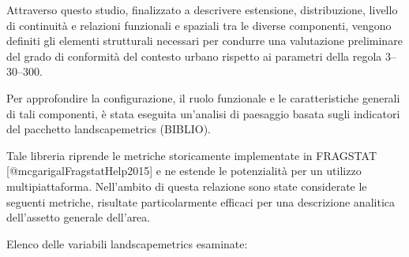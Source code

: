 \documentclass[
  a4paper,
]{book}
\begin{document}
Attraverso questo studio, finalizzato a descrivere estensione, distribuzione, livello di continuità e relazioni funzionali e spaziali tra le diverse componenti, vengono definiti gli elementi strutturali necessari per condurre una valutazione preliminare del grado di conformità del contesto urbano rispetto ai parametri della regola 3--30--300.

Per approfondire la configurazione, il ruolo funzionale e le caratteristiche generali di tali componenti, è stata eseguita un'analisi di paesaggio basata sugli indicatori del pacchetto landscapemetrics (BIBLIO).

Tale libreria riprende le metriche storicamente implementate in FRAGSTAT {[}@mcgarigalFragstatHelp2015{]} e ne estende le potenzialità per un utilizzo multipiattaforma. Nell'ambito di questa relazione sono state considerate le seguenti metriche, risultate particolarmente efficaci per una descrizione analitica dell'assetto generale dell'area.

Elenco delle variabili landscapemetrics esaminate:
\end{document}
